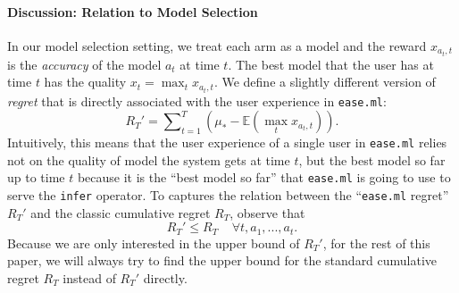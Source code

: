 \documentclass[letterpaper]{vldb}
\newcommand{\eml}{\texttt{ease.ml}\xspace}
\begin{document}
\paragraph*{Discussion: Relation to Model Selection} 
In our model selection setting, we treat each arm as
a model and the reward $x_{a_t, t}$ is the {\em accuracy} of
the model $a_t$ at time $t$. The best model that the user
has at time $t$ has the quality $x_t = \max_t x_{a_t, t}$. We
define a slightly different version of {\em regret} that is
directly associated with the user experience in \eml:
\[
R_{T}' = \sum\nolimits_{t=1}^{T} \left(\mu_* -  \mathbb{E}(\max_t x_{a_t, t})\right).
\]
Intuitively, this means that the user experience of a single
user in \eml relies not on the quality of model the system
gets at time $t$, but the best model so far up to time $t$ because
it is the ``best model so far'' that \eml is going to use 
to serve the \texttt{infer} operator. To
captures the relation between the ``\eml regret'' $R_T'$ and 
the classic cumulative regret $R_T$, observe that
\[
R_T' \leq R_T~~~~~\forall t, a_1,...,a_t.
\]
Because we are only interested in
the upper bound of $R_T'$, for the rest of this paper,
we will always try to find the upper bound for 
the standard cumulative regret $R_T$ instead of 
$R_T'$ directly.
\end{document}
